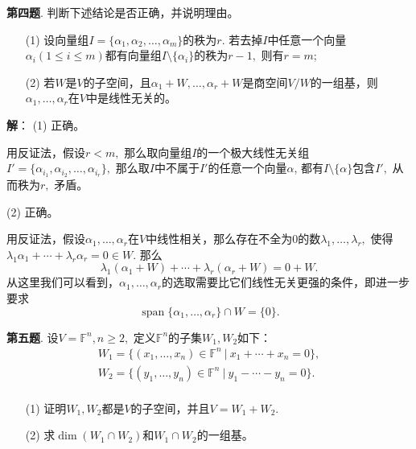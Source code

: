 \newpageorvspace

{\bf 第四题}. 判断下述结论是否正确，并说明理由。
\begin{itemize}
\item[(1)] 设向量组$I = \{ \alpha_1, \alpha_2, \ldots, \alpha_m \}$的秩为$r.$ 若去掉$I$中任意一个向量$\alpha_i (1 \leqslant i \leqslant m)$都有向量组$I \setminus \{ \alpha_i \}$的秩为$r-1,$ 则有$r = m$;
\item[(2)] 若$W$是$V$的子空间，且$\alpha_1 + W, \ldots, \alpha_r + W$是商空间$V / W$的一组基，则$\alpha_1, \ldots, \alpha_r$在$V$中是线性无关的。
\end{itemize}

\ifIncludeAnswer

\newpageorvspace

{\bf 解}： (1) 正确。

用反证法，假设$r < m,$ 那么取向量组$I$的一个极大线性无关组$I' = \{ \alpha_{i_1}, \alpha_{i_2}, \ldots, \alpha_{i_r} \},$ 那么取$I$中不属于$I'$的任意一个向量$\alpha$, 都有$I \setminus \{ \alpha \}$包含$I',$ 从而秩为$r,$ 矛盾。

(2) 正确。

用反证法，假设$\alpha_1, \ldots, \alpha_r$在$V$中线性相关，那么存在不全为0的数$\lambda_1, \ldots, \lambda_r,$ 使得$\lambda_1 \alpha_1 + \cdots + \lambda_r \alpha_r = 0 \in W.$ 那么
$$\lambda_1 (\alpha_1 + W) + \cdots + \lambda_r (\alpha_r + W) = 0 + W.$$
从这里我们可以看到，$\alpha_1, \ldots, \alpha_r$的选取需要比它们线性无关更强的条件，即进一步要求
$$\operatorname{span}\{ \alpha_1, \ldots, \alpha_r \} \cap W = \{0\}.$$

\fi  %

\newpageorvspace

{\bf 第五题}. 设$V = \mathbb{F}^n, n \geqslant 2,$ 定义$\mathbb{F}^n$的子集$W_1, W_2$如下：
\begin{gather*}
W_1 = \{ (x_1, \ldots, x_n) \in \mathbb{F}^n \ |\ x_1 + \cdots + x_n = 0 \}, \\
W_2 = \{ (y_1, \ldots, y_n) \in \mathbb{F}^n \ |\ y_1 - \cdots - y_n = 0 \}. \\
\end{gather*}
\begin{itemize}
\item[(1)] 证明$W_1, W_2$都是$V$的子空间，并且$V = W_1 + W_2$.
\item[(2)] 求$\dim (W_1 \cap W_2)$和$W_1 \cap W_2$的一组基。
\end{itemize}

\ifIncludeAnswer

